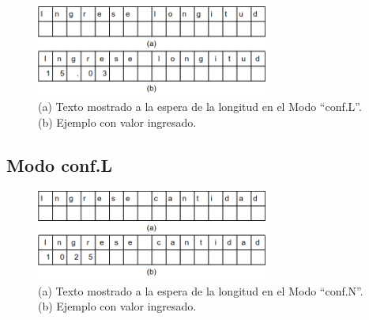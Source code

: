 \documentclass[main_conf.tex]{subfiles}
\begin{document}
\begin{figure}[!t]
  \centering
  \includegraphics[width=3.0in]{../img/modo/Conf_L.png}
  \caption{(a) Texto mostrado a la espera de la longitud en el Modo “conf.L”.
           (b) Ejemplo con valor ingresado.
  }
  \label{Modo_Conf_L}
\end{figure}

\subsection{Modo conf.L}

\begin{figure}[!t]
  \centering
  \includegraphics[width=3.0in]{../img/modo/Conf_N.png}
  \caption{(a) Texto mostrado a la espera de la longitud en el Modo “conf.N”.
           (b) Ejemplo con valor ingresado.
  }
  \label{Modo_Conf_N}
\end{figure}
\end{document}
